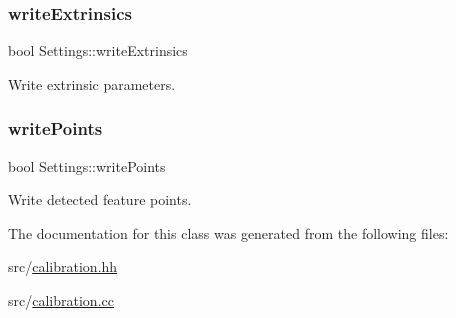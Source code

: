 \subsubsection{\texorpdfstring{write\+Extrinsics}{writeExtrinsics}}
{\footnotesize\ttfamily bool Settings\+::write\+Extrinsics}



Write extrinsic parameters. 

\mbox{\label{class_settings_a53ac449815682c6bfae7e50944ba0565}} 
\subsubsection{\texorpdfstring{write\+Points}{writePoints}}
{\footnotesize\ttfamily bool Settings\+::write\+Points}



Write detected feature points. 



The documentation for this class was generated from the following files\+:\begin{DoxyCompactItemize}
\item 
src/\mbox{\hyperlink{calibration_8hh}{calibration.\+hh}}\item 
src/\mbox{\hyperlink{calibration_8cc}{calibration.\+cc}}\end{DoxyCompactItemize}
